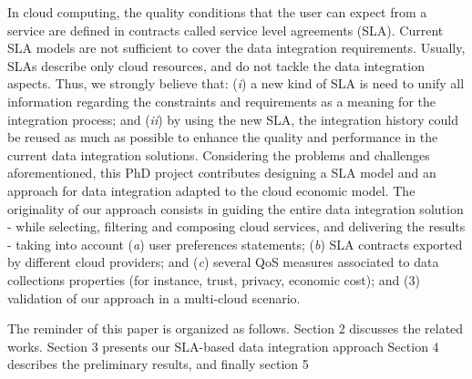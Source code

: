 In cloud computing, the quality conditions that the user can expect from a service are defined in contracts called service level agreements (SLA). 
%
Current SLA models are not sufficient to cover the data integration requirements. 
%
Usually, SLAs describe only cloud resources, and do not tackle the data integration aspects. 
%
Thus, we strongly believe that: 
(\textit{i}) a new kind of SLA is need to unify all information regarding the constraints and requirements as a meaning for the integration process; and 
(\textit{ii}) by using the new SLA, the integration history could be reused as much as possible to enhance the quality and performance in the current data integration solutions. 
%
Considering the problems and challenges aforementioned, this PhD project contributes designing a SLA model and an approach for data integration adapted to the cloud economic model. The originality of our approach consists in guiding the entire data integration solution - while selecting, filtering and composing cloud services, and delivering the results - taking into account (\textit{a}) user preferences statements; (\textit{b}) SLA contracts exported by different cloud providers; and (\textit{c}) several QoS measures associated to data collections properties (for instance, trust, privacy, economic cost); and (3) validation of our approach in a multi-cloud scenario.

The reminder of this paper is organized as follows.
Section 2 discusses the related works.
Section 3 presents our SLA-based data integration approach
Section 4 describes the preliminary results, and finally section 5 
